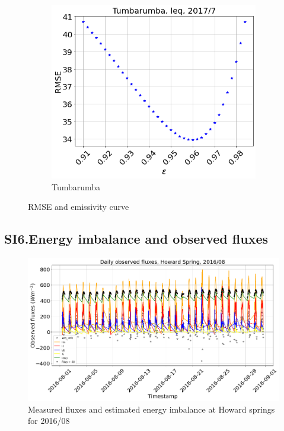 \documentclass[fleqn,10pt]{wlscirep}
\begin{document}
{\begin{figure}[h!]
\begin{subfigure}{.5\textwidth}
\end{subfigure}%
\begin{subfigure}{.5\textwidth}
  \centering
  \includegraphics[width=.95\linewidth]{tum_RMSE_2017}
  \caption{Tumbarumba}
\end{subfigure}
\setlength{\belowcaptionskip}{-3ex}
\caption{RMSE and emissivity curve}
\label{fig:rmse_eps}
\end{figure}

\subsection*{SI6.Energy imbalance and observed fluxes}
\label{Subsection:wnimb}
\begin{figure}[h!]
  \includegraphics[scale=0.5]{hs_enb.png}
  \caption{Measured fluxes and estimated energy imbalance at Howard springs for 2016/08}
  \label{fig:wninb}
  \end{figure}
  
}
\end{document}
